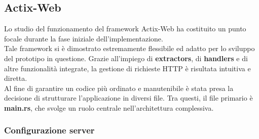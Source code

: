 \subsection{Actix-Web}
Lo studio del funzionamento del framework Actix-Web ha costituito un punto focale durante la fase iniziale dell'implementazione.
\\Tale framework si è dimostrato estremamente flessibile ed adatto per lo sviluppo del prototipo in questione.
Grazie all'impiego di \textbf{extractors}, di \textbf{handlers} e di altre funzionalità integrate, la gestione di richieste HTTP è risultata intuitiva e diretta.
\\Al fine di garantire un codice più ordinato e manutenibile è stata presa la decisione di strutturare l'applicazione in diversi file.
Tra questi, il file primario è \textbf{main.rs}, che svolge un ruolo centrale nell'architettura complessiva.
\subsubsection{Configurazione server}

